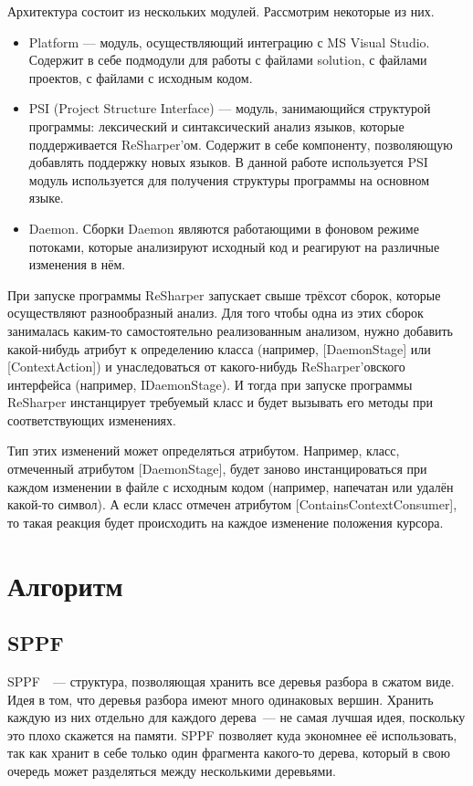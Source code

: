 Архитектура состоит из нескольких модулей. Рассмотрим некоторые из них.
\begin{itemize}
\item Platform --- модуль, осуществляющий интеграцию с MS Visual Studio. Содержит в себе подмодули для работы с файлами solution, с файлами проектов, с файлами с исходным кодом. 

\item PSI (Project Structure Interface) --- модуль, занимающийся структурой программы: лексический и синтаксический анализ языков, которые поддерживается ReSharper’ом. Содержит в себе компоненту, позволяющую добавлять поддержку новых языков. В данной работе используется PSI модуль используется для получения структуры программы на основном языке.

\item Daemon. Сборки Daemon являются работающими в фоновом режиме потоками, которые анализируют исходный код и реагируют на различные изменения в нём. 
	
\end{itemize}

При запуске программы ReSharper запускает свыше трёхсот сборок, которые осуществляют разнообразный анализ. Для того чтобы одна из этих сборок занималась каким-то самостоятельно реализованным анализом, нужно добавить какой-нибудь атрибут к определению класса (например, [DaemonStage] или [ContextAction]) и унаследоваться от какого-нибудь ReSharper’овского интерфейса (например, IDaemonStage). И тогда при запуске программы ReSharper инстанцирует требуемый класс и будет вызывать его методы при соответствующих изменениях. 

Тип этих изменений может определяться атрибутом. Например, класс, отмеченный атрибутом [DaemonStage], будет заново инстанцироваться при каждом изменении в файле с исходным кодом (например, напечатан или удалён какой-то символ). А если класс отмечен атрибутом [ContainsContextConsumer], то такая реакция будет происходить на каждое изменение положения курсора. 

\section{Алгоритм}
\subsection{SPPF}

SPPF~\cite{RNGLR}~--- структура, позволяющая хранить все деревья разбора в сжатом виде. Идея в том, что деревья разбора имеют много одинаковых вершин. Хранить каждую из них отдельно для каждого дерева~--- не самая лучшая идея, поскольку это плохо скажется на памяти. SPPF позволяет куда экономнее её использовать, так как хранит в себе только один фрагмента какого-то дерева, который в свою очередь может разделяться между несколькими деревьями. 


